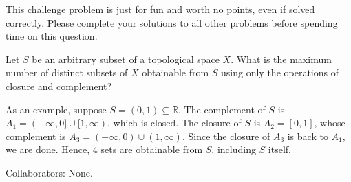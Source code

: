 \documentclass[10pt]{report}
\begin{document}
\begin{challenge}
	This challenge problem is just for fun and worth no points, even if solved correctly. Please complete your solutions to all other problems before spending time on this question.
	
	Let $S$ be an arbitrary subset of a topological space $X$. What is the maximum number of distinct subsets of $X$ obtainable from $S$ using only the operations of closure and complement?

	As an example, suppose $S = (0, 1) \subseteq \mathbb{R}$. The complement of $S$ is $A_1 = (-\infty, 0] \cup [1, \infty)$, which is closed. The closure of $S$ is $A_2 = [0, 1]$, whose complement is $A_3 = (-\infty, 0) \cup (1, \infty)$. Since the closure of $A_3$ is back to $A_1$, we are done. Hence, $4$ sets are obtainable from $S$, including $S$ itself.
\end{challenge}
{\color{red}Collaborators: None.}
\end{document}
